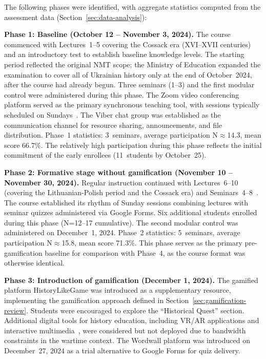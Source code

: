 The following phases were identified, with aggregate statistics computed from the assessment data (Section~\ref{sec:data-analysis}):

\textbf{Phase 1: Baseline (October 12 -- November 3, 2024).} The course commenced with Lectures~1--5 covering the Cossack era (XVI--XVII centuries) and an introductory test to establish baseline knowledge levels. The starting period reflected the original NMT scope; the Ministry of Education expanded the examination to cover all of Ukrainian history only at the end of October~2024, after the course had already begun. Three seminars (1--3) and the first modular control were administered during this phase. The Zoom video conferencing platform served as the primary synchronous teaching tool, with sessions typically scheduled on Sundays~\cite{Hlianenko2024}. The Viber chat group was established as the communication channel for resource sharing, announcements, and file distribution. Phase~1 statistics: 3~seminars, average participation N$\approx$14.3, mean score 66.7\%. The relatively high participation during this phase reflects the initial commitment of the early enrollees (11~students by October~25).

\textbf{Phase 2: Formative stage without gamification (November 10 -- November 30, 2024).} Regular instruction continued with Lectures~6--10 (covering the Lithuanian-Polish period and the Cossack era) and Seminars~4--8~\cite{Bonwell1991}. The course established its rhythm of Sunday sessions combining lectures with seminar quizzes administered via Google Forms. Six additional students enrolled during this phase (N=12--17 cumulative). The second modular control was administered on December~1, 2024. Phase~2 statistics: 5~seminars, average participation N$\approx$15.8, mean score 71.3\%. This phase serves as the primary pre-gamification baseline for comparison with Phase~4, as the course format was otherwise identical.

\textbf{Phase 3: Introduction of gamification (December 1, 2024).} The gamified platform HistoryLikeGame was introduced as a supplementary resource, implementing the gamification approach defined in Section~\ref{sec:gamification-review}. Students were encouraged to explore the ``Historical Quest'' section. Additional digital tools for history education, including VR/AR applications \cite{Alexov2023} and interactive multimedia~\cite{Ho2024139}, were considered but not deployed due to bandwidth constraints in the wartime context. The Wordwall platform was introduced on December~27, 2024 as a trial alternative to Google Forms for quiz delivery.

